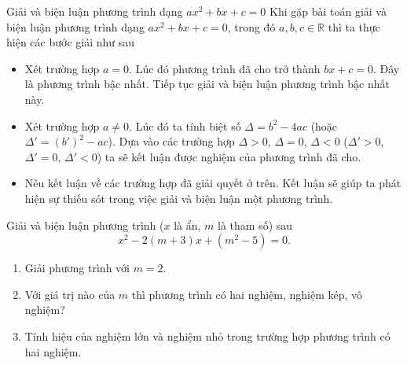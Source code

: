 \begin{dang}{Giải và biện luận phương trình dạng $ax^2+bx+c=0$}
Khi gặp bài toán giải và biện luận phương trình dạng $ax^2+bx+c=0$, trong đó $a,b,c\in\mathbb{R}$ thì ta thực hiện các bước giải như sau
\begin{itemize}
\item Xét trường hợp $a=0$. Lúc đó phương trình đã cho trở thành $bx+c=0$. Đây là phương trình bậc nhất. Tiếp tục giải và biện luận phương trình bậc nhất này.
\item Xét trường hợp $a\ne 0$. Lúc đó ta tính biệt số $\Delta=b^2-4ac$ (hoặc $\Delta'=\left(b'\right)^2-ac$). Dựa vào các trường hợp $\Delta>0$, $\Delta=0$, $\Delta<0$ ($\Delta'>0$, $\Delta'=0$, $\Delta'<0$) ta sẽ kết luận được nghiệm của phương trình đã cho.
\item Nêu kết luận về các trường hợp đã giải quyết ở trên. Kết luận sẽ giúp ta phát hiện sự thiếu sót trong việc giải và biện luận một phương trình.
\end{itemize}
\end{dang}
\begin{vd}
	Giải và biện luận phương trình ($x$ là ẩn, $m$ là tham số) sau
\[x^2-2(m+3)x+(m^2-5)=0.\tag{1}\]
\begin{enumerate}
\item Giải phương trình với $m=2$.
\item Với giá trị nào của $m$ thì phương trình có hai nghiệm, nghiệm kép, vô nghiệm?
\item Tính hiệu của nghiệm lớn và nghiệm nhỏ trong trường hợp phương trình có hai nghiệm.
\end{enumerate}
\end{vd}
